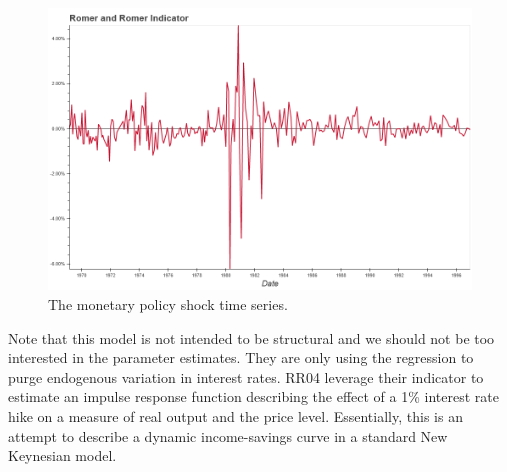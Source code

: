 \documentclass[a4paper,man,floatsintext,natbib]{apa6}
\begin{document}
	\begin{figure}
		\centering
		\includegraphics[width=\textwidth]{charts/rr04.png}
		\caption{\label{rr04} The \cite{Romer2004} monetary policy shock time series.}
	\end{figure}
	Note that this model is not intended to be structural and we should not be too interested in the parameter estimates. They are only using the regression to purge endogenous variation in interest rates. RR04 leverage their indicator to estimate an impulse response function describing the effect of a 1\% interest rate hike on a measure of real output and the price level. Essentially, this is an attempt to describe a dynamic income-savings curve in a standard New Keynesian model. 
	
\end{document}
